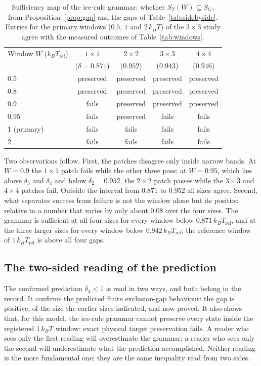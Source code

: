 \documentclass[11pt,a4paper]{article}
\theoremstyle{plain}
\theoremstyle{definition}
\theoremstyle{remark}
\newcommand{\SG}{S_{G}}
\newcommand{\ST}{S_{T}}
\newcommand{\kBT}{k_{B}T}
\begin{document}
\begin{table}[t]
\centering\small
\caption{Sufficiency map of the ice-rule grammar: whether $\ST(W)\subseteq\SG$, from Proposition~\ref{prop:gap} and the gaps of Table~\ref{tab:sidebyside}. Entries for the primary windows ($0.5$, $1$ and $2\,\kBT$) of the $3\times3$ study agree with the measured outcomes of Table~\ref{tab:windows}.}
\label{tab:map}
\begin{tabular}{@{}lcccc@{}}
\toprule
Window $W$ ($\kBT_{\mathrm{ref}}$) & $1\times1$ & $2\times2$ & $3\times3$ & $4\times4$\\
 & ($\delta=0.871$) & ($0.952$) & ($0.943$) & ($0.946$)\\
\midrule
0.5 & preserved & preserved & preserved & preserved\\
0.8 & preserved & preserved & preserved & preserved\\
0.9 & fails & preserved & preserved & preserved\\
0.95 & fails & preserved & fails & fails\\
1 (primary) & fails & fails & fails & fails\\
2 & fails & fails & fails & fails\\
\bottomrule
\end{tabular}
\end{table}

Two observations follow. First, the patches disagree only inside narrow bands. At $W=0.9$ the $1\times1$ patch fails while the other three pass; at $W=0.95$, which lies above $\delta_3$ and $\delta_4$ and below $\delta_2=0.952$, the $2\times2$ patch passes while the $3\times3$ and $4\times4$ patches fail. Outside the interval from $0.871$ to $0.952$ all sizes agree. Second, what separates success from failure is not the window alone but its position relative to a number that varies by only about 0.08 over the four sizes. The grammar is sufficient at all four sizes for every window below $0.871\,\kBT_{\mathrm{ref}}$, and at the three larger sizes for every window below $0.942\,\kBT_{\mathrm{ref}}$; the reference window of $1\,\kBT_{\mathrm{ref}}$ is above all four gaps.

\subsection{The two-sided reading of the prediction}
The confirmed prediction $\delta_4<1$ is read in two ways, and both belong in the record. It confirms the predicted finite exclusion-gap behaviour: the gap is positive, of the size the earlier sizes indicated, and now proved. It also shows that, for this model, the ice-rule grammar cannot preserve every state inside the registered $1\,\kBT$ window: exact physical target preservation fails. A reader who sees only the first reading will overestimate the grammar; a reader who sees only the second will underestimate what the prediction accomplished. Neither reading is the more fundamental one; they are the same inequality read from two sides.
\end{document}
